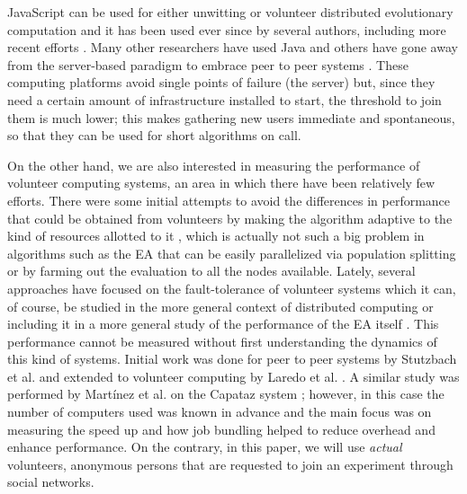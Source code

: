 \documentclass[letterpaper]{article}
\begin{document}
JavaScript can be used for either unwitting
\citep{unwitting-ec,boldrin2007distributed} or volunteer 
\citep{langdon:2005:metas,gecco07:workshop:dcor} distributed
evolutionary computation and it has been used ever since by several
authors, including more recent efforts
\citep{Desell:2008:AHG:1389095.1389273,duda2013distributed,DBLP:journals/corr/abs-0801-1210}. Many other researchers have
used Java \citep{chong:1999:jDGPi} and others have gone away from the
server-based paradigm to embrace peer to peer systems
\citep{jin2006constructing,10.1109/ICICSE.2008.99,DBLP:conf/3pgcic/GuervosMFEL12}. These computing
platforms avoid single points of failure (the server) but, since they
need a certain amount of infrastructure installed to start, the
threshold to join them is much lower; this makes gathering new users
immediate and spontaneous, so that they can be used for short
algorithms on call.


On the other hand, we are also interested in measuring the performance
of volunteer computing systems, an area in which there have been
relatively few efforts.
There were some initial attempts to avoid the differences in performance
that could be obtained from volunteers  by making
the algorithm adaptive to the kind of resources allotted to it
\citep{milani2004online}, which is actually not such a big problem in
algorithms such as the EA that can be easily 
parallelized via population splitting or by farming out the evaluation to all
the nodes available. Lately, several approaches have focused on the
fault-tolerance of volunteer systems
\citep{gonzalez2010characterizing} which it can, of course, be studied in
the more general context of distributed computing 
\citep{nogueras2015studying} or including it in a more general study of the
performance of the EA itself
\citep{DBLP:journals/gpem/LaredoBGVAGF14}. This performance cannot be
measured without first understanding the dynamics of this kind of systems. Initial
work was done for peer to peer systems by Stutzbach et
al. \citep{stutzbach2006understanding} and extended to volunteer
computing by Laredo et al. \citep{churn08,laredo2008rcp}. A similar
study was performed by Martínez et al. on the Capataz system
\citep{martinez2015capataz}; however, in this case the number of
computers used was known in advance and the main focus was on
measuring the speed up and how job bundling helped to reduce overhead and
enhance performance. On the contrary, in this paper, we will use {\em
  actual} volunteers, anonymous persons that are requested to join an
experiment through social networks.
\end{document}
